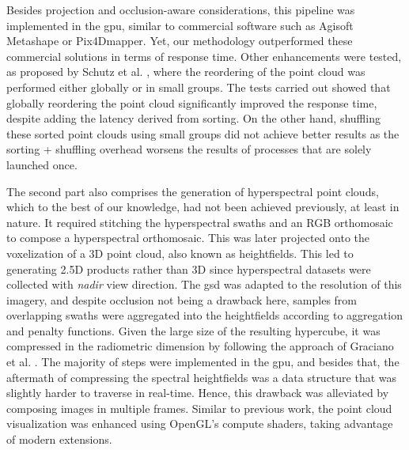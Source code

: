 Besides projection and occlusion-aware considerations, this pipeline was implemented in the \acrshort{gpu}, similar to commercial software such as Agisoft Metashape or Pix4Dmapper. Yet, our methodology outperformed these commercial solutions in terms of response time. Other enhancements were tested, as proposed by Schutz et al. \cite{schutz_rendering_2021}, where the reordering of the point cloud was performed either globally or in small groups. The tests carried out showed that globally reordering the point cloud significantly improved the response time, despite adding the latency derived from sorting. On the other hand, shuffling these sorted point clouds using small groups did not achieve better results as the sorting + shuffling overhead worsens the results of processes that are solely launched once.  

The second part also comprises the generation of hyperspectral point clouds, which to the best of our knowledge, had not been achieved previously, at least in nature. It required stitching the hyperspectral swaths and an RGB orthomosaic to compose a hyperspectral orthomosaic. This was later projected onto the voxelization of a 3D point cloud, also known as heightfields. This led to generating 2.5D products rather than 3D since hyperspectral datasets were collected with \textit{nadir} view direction. The \acrshort{gsd} was adapted to the resolution of this imagery, and despite occlusion not being a drawback here, samples from overlapping swaths were aggregated into the heightfields according to aggregation and penalty functions. Given the large size of the resulting hypercube, it was compressed in the radiometric dimension by following the approach of Graciano et al. \cite{graciano_real-time_2018}. The majority of steps were implemented in the \acrshort{gpu}, and besides that, the aftermath of compressing the spectral heightfields was a data structure that was slightly harder to traverse in real-time. Hence, this drawback was alleviated by composing images in multiple frames. Similar to previous work, the point cloud visualization was enhanced using OpenGL's compute shaders, taking advantage of modern extensions.

